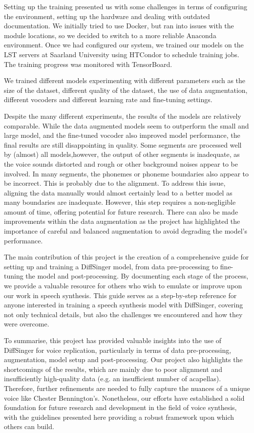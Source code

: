 \documentclass[a4paper]{article}
\begin{document}
Setting up the training presented us with some challenges in terms of configuring the environment, setting up the hardware and dealing with outdated documentation. We initially tried to use Docker, but ran into issues with the module locations, so we decided to switch to a more reliable Anaconda environment. Once we had configured our system, we trained our models on the LST servers at Saarland University using HTCondor to schedule training jobs. The training progress was monitored with TensorBoard.

We trained different models experimenting with different parameters such as the size of the dataset, different quality of the dataset, the use of data augmentation, different vocoders and different learning rate and fine-tuning settings.


Despite the many different experiments, the results of the models are relatively comparable. While the data augmented models seem to outperform the small and large model, and the fine-tuned vocoder also improved model performance, the final results are still disappointing in quality. Some segments are processed well by (almost) all models,however, the output of other segments is inadequate, as the voice sounds distorted and rough or other background noises appear to be involved. In many segments, the phonemes or phoneme boundaries also appear to be incorrect. This is probably due to the alignment. To address this issue, aligning the data manually would almost certainly lead to a better model as many boundaries are inadequate. However, this step requires a non-negligible amount of time, offering potential for future research. There can also be made improvements within the data augmentation as the project has highlighted the importance of careful and balanced augmentation to avoid degrading the model’s performance.

The main contribution of this project is the creation of a comprehensive guide for setting up and training a DiffSinger model, from data pre-processing to fine-tuning the model and post-processing. By documenting each stage of the process, we provide a valuable resource for others who wish to emulate or improve upon our work in speech synthesis. This guide serves as a step-by-step reference for anyone interested in training a speech synthesis model with DiffSinger, covering not only technical details, but also the challenges we encountered and how they were overcome.


To summarise, this project has provided valuable insights into the use of DiffSinger for voice replication, particularly in terms of data pre-processing, augmentation, model setup and post-processing. Our project also highlights the shortcomings of the results, which are mainly due to poor alignment and insufficiently high-quality data (e.g. an insufficient number of acapellas).  Therefore, further refinements are needed to fully capture the nuances of a unique voice like Chester Bennington's. Nonetheless, our efforts have established a solid foundation for future research and development in the field of voice synthesis, with the guidelines presented here providing a robust framework upon which others can build.


\end{document}
